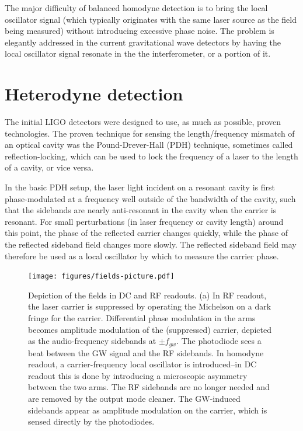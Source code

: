 The major difficulty of balanced homodyne detection is to bring the
local oscillator signal (which typically originates with the same
laser source as the field being measured) without introducing
excessive phase noise.  The problem is elegantly addressed in the
current gravitational wave detectors by having the local oscillator
signal resonate in the the interferometer, or a portion of it.

\section{Heterodyne detection}

The initial LIGO detectors were designed to use, as much as possible,
proven technologies.  The proven technique for sensing the
length/frequency mismatch of an optical cavity was the
Pound-Drever-Hall (PDH)
technique\cite{Drever1983Laser,Black2001Introduction}, sometimes
called reflection-locking, which can be used to lock the frequency of
a laser to the length of a cavity, or vice versa.

In the basic PDH setup, the laser light incident on a resonant cavity
is first phase-modulated at a frequency well outside of the bandwidth
of the cavity, such that the sidebands are nearly anti-resonant in the
cavity when the carrier is resonant.  For small perturbations (in
laser frequency or cavity length) around this point, the phase of the
reflected carrier changes quickly, while the phase of the reflected
sideband field changes more slowly.  The reflected sideband field may
therefore be used as a local oscillator by which to measure the
carrier phase.

\begin{figure}
\texttt{[image: figures/fields-picture.pdf]}
\caption[Frequency-domain fields in DC and RF readouts]{Depiction of
  the fields in DC and RF readouts.  (a) In RF readout, the laser
  carrier is suppressed by operating the Michelson on a dark fringe
  for the carrier.  Differential phase modulation in the arms becomes
  amplitude modulation of the (suppressed) carrier, depicted as the
  audio-frequency sidebands at $\pm f_{gw}$.  The photodiode sees a
  beat between the GW signal and the RF sidebands.  In homodyne
  readout, a carrier-frequency local oscillator is introduced--in DC
  readout this is done by introducing a microscopic asymmetry between
  the two arms.  The RF sidebands are no longer needed and are removed
  by the output mode cleaner.  The GW-induced sidebands appear as
  amplitude modulation on the carrier, which is sensed directly by the
  photodiodes.}
\end{figure}

